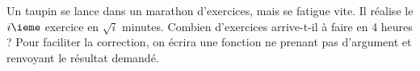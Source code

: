 \question Un taupin se lance dans un marathon d'exercices, mais se fatigue vite. Il réalise le $i\ieme$ exercice en $\sqrt{i}$ minutes. Combien d'exercices arrive-t-il à faire en 4 heures ? 
Pour faciliter la correction, on écrira une fonction  ne prenant pas d'argument et renvoyant le résultat demandé.